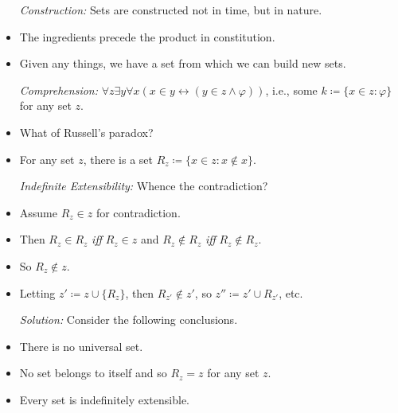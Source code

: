\documentclass[a4paper, 11pt]{article} %
\newcommand{\set}[1]{\lbrace#1\rbrace} %
\begin{document}
  \begin{itemize}
    \item[\it Construction:] Sets are constructed not in time, but in nature.
      \item The ingredients precede the product in constitution.
      \item Given any things, we have a set from which we can build new sets.
    \item[\it Comprehension:] $\forall z\exists y\forall x(x \in y \leftrightarrow (y \in z \wedge \varphi))$, i.e., some $k \coloneq \set{x \in z : \varphi}$ for any set $z$.
      \item What of Russell's paradox?
      \item For any set $z$, there is a set $R_z \coloneq \set{x \in z : x \notin x}$.
    \item[\it Indefinite Extensibility:] Whence the contradiction?
      \item Assume $R_z \in z$ for contradiction.
      \item Then $R_z \in R_z$ \textit{iff} $R_z \in z$ and $R_z \notin R_z$ \textit{iff} $R_z \notin R_z$. 
      \item So $R_z \notin z$.
      \item Letting $z'\coloneq z\cup\set{R_z}$, then $R_{z'} \notin z'$, so $z'' \coloneq z'\cup{R_{z'}}$, etc.
    \item[\it Solution:] Consider the following conclusions.
      \item There is no universal set.
      \item No set belongs to itself and so $R_z = z$ for any set $z$.
      \item Every set is indefinitely extensible.
  \end{itemize}
\end{document}
